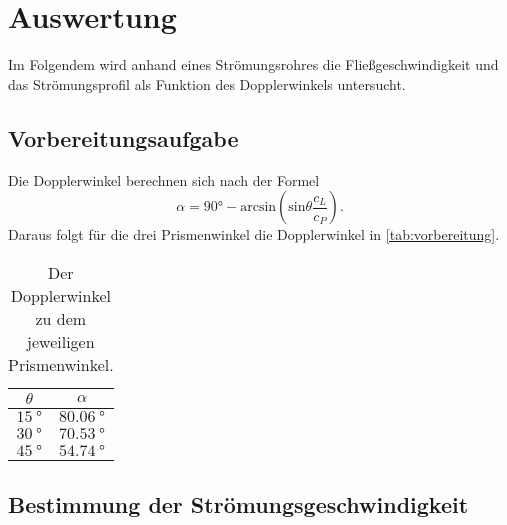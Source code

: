\section{Auswertung}
\label{sec:Auswertung}

Im Folgendem wird anhand eines Strömungsrohres die Fließgeschwindigkeit und
das Strömungsprofil als Funktion des Dopplerwinkels untersucht.


\subsection{Vorbereitungsaufgabe}

Die Dopplerwinkel berechnen sich nach der Formel
\begin{equation}
    \alpha = 90° - \text{arcsin}\left(\text{sin} \theta \frac{c_L}{c_P}\right).
\end{equation}
Daraus folgt für die drei Prismenwinkel die Dopplerwinkel in \autoref{tab:vorbereitung}.
\begin{table}
  \centering
  \caption{Der Dopplerwinkel zu dem jeweiligen Prismenwinkel.}
  \label{tab:vorbereitung}
  \begin{tabular}{c c}
    \toprule
    $\theta$ &  $\alpha$ \\ 
    \midrule
      $\qty{15}{°}$ & $\qty{80.06}{°}$ \\
      $\qty{30}{°}$ & $\qty{70.53}{°}$ \\
      $\qty{45}{°}$ & $\qty{54.74}{°}$ \\
    \bottomrule
  \end{tabular}
\end{table}


\subsection{Bestimmung der Strömungsgeschwindigkeit}

